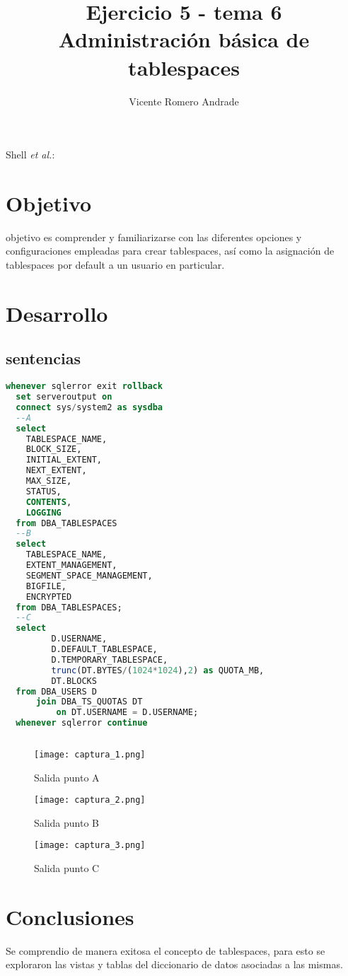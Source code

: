 \documentclass[journal]{IEEEtran}
\begin{document}
\title{Ejercicio 5 - tema 6 \\ Administración básica de tablespaces}
%
\author{Vicente Romero Andrade}

%
{Shell \MakeLowercase{\textit{et al.}}: }

\maketitle


\IEEEpeerreviewmaketitle

\section{Objetivo}

 objetivo es comprender y familiarizarse con las diferentes opciones y configuraciones 
empleadas para crear tablespaces, así como la asignación de tablespaces por default a un usuario en particular.
\section{Desarrollo}
\subsection{sentencias}
\begin{lstlisting}[language=sql, caption=s-00-consulta-tablespaces.sql,label={lst:codigo1}]
  whenever sqlerror exit rollback
  set serveroutput on
  connect sys/system2 as sysdba
  --A
  select
    TABLESPACE_NAME,
    BLOCK_SIZE,
    INITIAL_EXTENT,
    NEXT_EXTENT,
    MAX_SIZE,
    STATUS,
    CONTENTS,
    LOGGING
  from DBA_TABLESPACES
  --B
  select
    TABLESPACE_NAME,
    EXTENT_MANAGEMENT,
    SEGMENT_SPACE_MANAGEMENT,
    BIGFILE,
    ENCRYPTED
  from DBA_TABLESPACES;
  --C
  select
         D.USERNAME,
         D.DEFAULT_TABLESPACE,
         D.TEMPORARY_TABLESPACE,
         trunc(DT.BYTES/(1024*1024),2) as QUOTA_MB,
         DT.BLOCKS
  from DBA_USERS D
      join DBA_TS_QUOTAS DT
          on DT.USERNAME = D.USERNAME;
  whenever sqlerror continue
  
\end{lstlisting}
\begin{figure}[H]
  \centering
  \texttt{[image: captura\_1.png]}
   \caption{Salida punto A}
   \label{fig:validador_1}
\end{figure}
\begin{figure}[H]
  \centering
  \texttt{[image: captura\_2.png]}
   \caption{Salida punto B}
   \label{fig:validador_2}
\end{figure}
\begin{figure}[H]
  \centering
  \texttt{[image: captura\_3.png]}
   \caption{Salida punto C}
   \label{fig:validador_3}
\end{figure}

\section{Conclusiones}
Se comprendio de manera exitosa el concepto de tablespaces, para esto se exploraron las vistas y 
tablas del diccionario de datos asociadas a las mismas.
\ifCLASSOPTIONcaptionsoff
  \newpage

\fi
\end{document}
